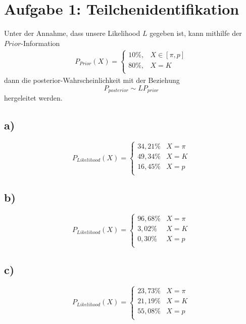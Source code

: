 \section*{Aufgabe 1: Teilchenidentifikation}
\label{sec:Aufgabe1}
Unter der Annahme, dass unsere Likelihood $L$ gegeben ist,
kann mithilfe der $Prior$-Information
\begin{align}
    P_{Prior}(X)=\begin{cases}
        10\%, & X\in[\pi,p] \\
        80\%, & X = K\\
    \end{cases}
\end{align}
dann die posterior-Wahrscheinlichkeit mit der Beziehung
\begin{equation}
    P_{posterior}\sim LP_{prior}
\end{equation}
hergeleitet werden.
\subsection*{a)}
\begin{equation}
    P_{Likelihood}(X)=\begin{cases}
        34,21\%   & X=\pi\\
        49,34\%   & X=K\\
        16,45\%   & X=p\\
    \end{cases}
\end{equation}

\subsection*{b)}
\begin{equation}
    P_{Likelihood}(X)=\begin{cases}
        96,68\%   & X=\pi\\
        3,02\%    & X=K\\
        0,30\%    & X=p\\
    \end{cases}
\end{equation}

\subsection*{c)}
\begin{equation}
    P_{Likelihood}(X)=\begin{cases}
        23,73\%  & X=\pi\\
        21,19\%  & X=K\\
        55,08\%  & X=p\\
    \end{cases}
\end{equation}